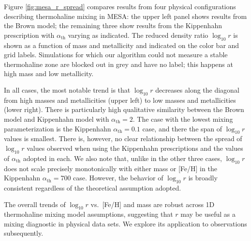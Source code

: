 %
%
Figure \ref{fig:mesa_r_spread} compares results from four physical configurations describing thermohaline mixing in MESA: the upper left panel shows results from the Brown model; the remaining three show results from the Kippenhahn prescription with $\alpha_{\text{th}}$ varying as indicated. The reduced density ratio $\log_{10} r$ is shown as a function of mass and metallicity and indicated on the color bar and grid labels.
Simulations for which our algorithm could not measure a stable thermohaline zone are blocked out in grey and have no label; this happens at high mass and low metallicity.
%

In all cases, the most notable trend is that $\log_{10} r$ decreases along the diagonal from high masses and metallicities (upper left) to low masses and metallicities (lower right). 
There is particularly high qualitative similarity between the Brown model and Kippenhahn model with $\alpha_{\text{th}} = 2$. 
The case with the lowest mixing parameterization is the Kippenhahn $\alpha_{\text{th}} = 0.1$ case, and there the span of $\log_{10} r$ values is smallest. There is, however, no clear relationship between the spread of $\log_{10} r$ values observed when using the Kippenhahn prescriptions and the values of $\alpha_{\text{th}}$ adopted in each. 
We also note that, unlike in the other three cases, $\log_{10} r$ does not scale precisely monotonically with either mass or [Fe/H] in the Kippenhahn $\alpha_{\text{th}} = 700$ case. 
However, the behavior of $\log_{10} r$ is broadly consistent regardless of the theoretical assumption adopted.

The overall trends of $\log_{10} r$ vs.~[Fe/H] and mass are  
robust across 1D thermohaline mixing model assumptions, suggesting that $r$ may be useful as a mixing diagnostic in physical data sets. We explore its application to observations subsequently.


